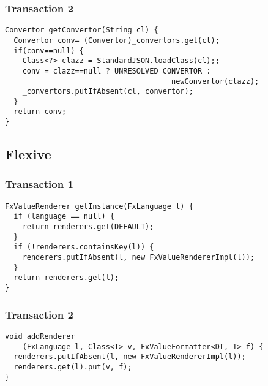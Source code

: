 %
%
%

\subsubsection*{Transaction 2}
\begin{lstlisting}
Convertor getConvertor(String cl) {
  Convertor conv= (Convertor)_convertors.get(cl);
  if(conv==null) {
    Class<?> clazz = StandardJSON.loadClass(cl);;
    conv = clazz==null ? UNRESOLVED_CONVERTOR : 
                                      newConvertor(clazz);
    _convertors.putIfAbsent(cl, convertor);
  }
  return conv;
}
\end{lstlisting}


%
%
%

\subsection{Flexive}

\subsubsection*{Transaction 1}
\begin{lstlisting}
FxValueRenderer getInstance(FxLanguage l) {
  if (language == null) {
    return renderers.get(DEFAULT);
  }
  if (!renderers.containsKey(l)) {
    renderers.putIfAbsent(l, new FxValueRendererImpl(l));
  }
  return renderers.get(l);
}
\end{lstlisting}

%
%
%
%
\pagebreak
\subsubsection*{Transaction 2}
\begin{lstlisting}
void addRenderer
    (FxLanguage l, Class<T> v, FxValueFormatter<DT, T> f) {
  renderers.putIfAbsent(l, new FxValueRendererImpl(l));
  renderers.get(l).put(v, f);
}
\end{lstlisting}


